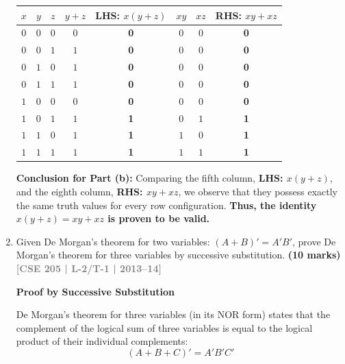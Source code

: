 \documentclass[12pt,a3paper]{article}
\newcommand{\yr}[1]{\hfill\textcolor{gray}{\small\textbf{[#1]}}}
\newcommand{\mk}[1]{\textcolor{orange!70!black}{\small\textbf{(#1 marks)}}}
\begin{document}
\begin{enumerate}
\begin{tcolorbox}[enhanced,breakable,ansbox,colback=cA!4,colframe=cA,boxrule=0.8pt,arc=5pt,title={\textbf{Answer}},fonttitle=\bfseries\color{white},colbacktitle=cA]
\begin{center}
\renewcommand{\arraystretch}{1.3}
\begin{tabular}{|c|c|c||c|c||c|c||c|}
\hline
\textbf{$x$} & \textbf{$y$} & \textbf{$z$} & \textbf{$y + z$} & \textbf{LHS: $x(y + z)$} & \textbf{$xy$} & \textbf{$xz$} & \textbf{RHS: $xy + xz$} \\
\hline
$0$ & $0$ & $0$ & $0$ & \textbf{0} & $0$ & $0$ & \textbf{0} \\
\hline
$0$ & $0$ & $1$ & $1$ & \textbf{0} & $0$ & $0$ & \textbf{0} \\
\hline
$0$ & $1$ & $0$ & $1$ & \textbf{0} & $0$ & $0$ & \textbf{0} \\
\hline
$0$ & $1$ & $1$ & $1$ & \textbf{0} & $0$ & $0$ & \textbf{0} \\
\hline
$1$ & $0$ & $0$ & $0$ & \textbf{0} & $0$ & $0$ & \textbf{0} \\
\hline
$1$ & $0$ & $1$ & $1$ & \textbf{1} & $0$ & $1$ & \textbf{1} \\
\hline
$1$ & $1$ & $0$ & $1$ & \textbf{1} & $1$ & $0$ & \textbf{1} \\
\hline
$1$ & $1$ & $1$ & $1$ & \textbf{1} & $1$ & $1$ & \textbf{1} \\
\hline
\end{tabular}
\end{center}

\vspace{0.2cm}
\textbf{Conclusion for Part (b):} 
Comparing the fifth column, \textbf{LHS: $x(y + z)$}, and the eighth column, \textbf{RHS: $xy + xz$}, we observe that they possess exactly the same truth values for every row configuration. \textbf{Thus, the identity $x(y + z) = xy + xz$ is proven to be valid.}

\end{tcolorbox}

\item Given De Morgan's theorem for two variables: $(A + B)' = A'B'$, prove De Morgan's theorem for three variables by successive substitution.
\mk{10} \yr{CSE 205 | L-2/T-1 | 2013--14}

\begin{tcolorbox}[enhanced,breakable,ansbox,colback=cA!4,colframe=cA,boxrule=0.8pt,arc=5pt,title={\textbf{Answer}},fonttitle=\bfseries\color{white},colbacktitle=cA]

\textbf{Proof by Successive Substitution}

De Morgan's theorem for three variables (in its NOR form) states that the complement of the logical sum of three variables is equal to the logical product of their individual complements:
\[ (A + B + C)' = A'B'C' \]


\end{tcolorbox}
\end{enumerate}
\end{document}
